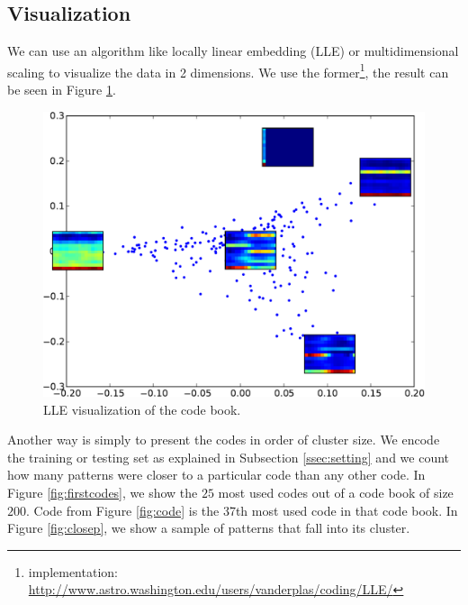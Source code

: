 \documentclass{article}
\begin{document}
\subsection{Visualization}
We can use an algorithm like locally linear embedding \cite{Roweis2000} (LLE) 
or multidimensional scaling \cite{Kruskal1964} to visualize the data in
2 dimensions. We use the former\footnote{implementation: 
\url{http://www.astro.washington.edu/users/vanderplas/coding/LLE/}}, the
result can be seen in Figure \ref{fig:lle}.


\begin{figure}[htb]
\begin{center}
\includegraphics[width=.9\columnwidth]{codes_lle}
\end{center}
\caption{{LLE visualization of the code book.}}
\label{fig:lle}
\end{figure}

Another way is simply to present the codes in order of cluster size.
We encode the training or testing set as explained in Subsection 
\ref{ssec:setting} and we count how many patterns were closer to a particular
code than any other code. In Figure \ref{fig:firstcodes}, we show the $25$
most used codes out of a code book of size $200$.
Code from Figure \ref{fig:code} is the 37th most used code in that
code book. In Figure \ref{fig:closep}, we show a sample of patterns that
fall into its cluster.
\end{document}
